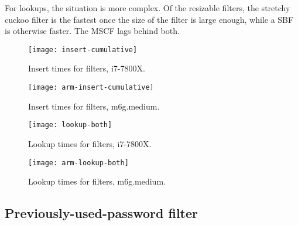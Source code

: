 \documentclass[letterpaper,twocolumn,10pt]{article}
\newcommand{\taffy}{stretchy}
\newcommand{\TBF}{SBF}
\newcommand{\MTCF}{MSCF}
\newcommand{\taffy}{taffy}
\newcommand{\TBF}{TBF}
\newcommand{\MTCF}{MTCF}
\begin{document}
For lookups, the situation is more complex.
Of the resizable filters, the \taffy{} cuckoo filter is the fastest once the size of the filter is large enough, while a \TBF{} is otherwise faster.
The \MTCF{} lags behind both.

\begin{figure}[b!]
  \texttt{[image: insert-cumulative]}
  \caption{
    \label{insert-time}
    Insert times for filters, i7-7800X.
  }
\end{figure}

\begin{figure}[b!]
  \texttt{[image: arm-insert-cumulative]}
  \caption{
    \label{arm-insert-time}
    Insert times for filters, m6g.medium.
  }
\end{figure}

\begin{figure}[b!]
  \texttt{[image: lookup-both]}
  \caption{
    \label{lookup-both}
    Lookup times for filters, i7-7800X.
  }
\end{figure}

\begin{figure}[b!]
  \texttt{[image: arm-lookup-both]}
  \caption{
    \label{arm-lookup-both}
    Lookup times for filters, m6g.medium.
  }
\end{figure}


\subsection{Previously-used-password filter}
\label{hibp}
\end{document}

